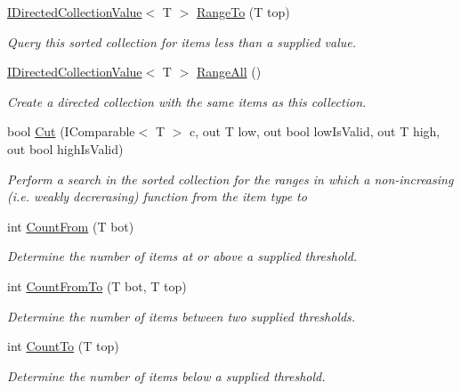 \begin{DoxyCompactItemize}
\hyperlink{interface_c5_1_1_i_directed_collection_value}{I\+Directed\+Collection\+Value}$<$ T $>$ \hyperlink{class_c5_1_1_tree_bag_a44f45590537870cc8ec683fed36c5816}{Range\+To} (T top)
\begin{DoxyCompactList}\small\item\em Query this sorted collection for items less than a supplied value. \end{DoxyCompactList}\item 
\hyperlink{interface_c5_1_1_i_directed_collection_value}{I\+Directed\+Collection\+Value}$<$ T $>$ \hyperlink{class_c5_1_1_tree_bag_acf45ec3c91638538bb0a6a319c6d272a}{Range\+All} ()
\begin{DoxyCompactList}\small\item\em Create a directed collection with the same items as this collection. \end{DoxyCompactList}\item 
bool \hyperlink{class_c5_1_1_tree_bag_acc49acf645ee2aa64441c97d693cf111}{Cut} (I\+Comparable$<$ T $>$ c, out T low, out bool low\+Is\+Valid, out T high, out bool high\+Is\+Valid)
\begin{DoxyCompactList}\small\item\em Perform a search in the sorted collection for the ranges in which a non-\/increasing (i.\+e. weakly decrerasing) function from the item type to \end{DoxyCompactList}\item 
int \hyperlink{class_c5_1_1_tree_bag_a5fbb54d05147aad25ba53f3102f68d8b}{Count\+From} (T bot)
\begin{DoxyCompactList}\small\item\em Determine the number of items at or above a supplied threshold. \end{DoxyCompactList}\item 
int \hyperlink{class_c5_1_1_tree_bag_a4ee93d234390b558f6566446502fd2d8}{Count\+From\+To} (T bot, T top)
\begin{DoxyCompactList}\small\item\em Determine the number of items between two supplied thresholds. \end{DoxyCompactList}\item 
int \hyperlink{class_c5_1_1_tree_bag_a13df18062b967b1272be0eaea3da65bb}{Count\+To} (T top)
\begin{DoxyCompactList}\small\item\em Determine the number of items below a supplied threshold. \end{DoxyCompactList}\item 

\end{DoxyCompactItemize}

